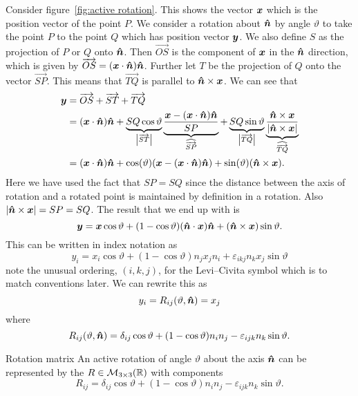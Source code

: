 \documentclass[a4paper]{article}
\newcommand{\nxmMatrices}[3]{\mathcal{M}_{{#1}\times{#2}}({#3})}
\begin{document}
    Consider figure~\ref{fig:active rotation}.
    This shows the vector \(\bm{x}\) which is the position vector of the point \(P\).
    We consider a rotation about \(\bm{\hat{n}}\) by angle \(\vartheta\) to take the point \(P\) to the point \(Q\) which has position vector \(\bm{y}\).
    We also define \(S\) as the projection of \(P\) or \(Q\) onto \(\bm{\hat{n}}\).
    Then \(\overrightarrow{OS}\) is the component of \(\bm{x}\) in the \(\bm{\hat{n}}\) direction, which is given by \(\overrightarrow{OS} = (\bm{x}\cdot\bm{\hat{n}})\bm{\hat{n}}\).
    Further let \(T\) be the projection of \(Q\) onto the vector \(\overrightarrow{SP}\).
    This means that \(\overrightarrow{TQ}\) is parallel to \(\bm{\hat{n}}\times\bm{x}\).
    We can see that
    \begin{align*}
        \bm{y} &= \overrightarrow{OS} + \overrightarrow{ST} + \overrightarrow{TQ}\\
        &= (\bm{x}\cdot\bm{\hat{n}})\bm{\hat{n}} + \underbrace{SQ\cos\vartheta}_{\abs{\overrightarrow{ST}}} \underbrace{\frac{\bm{x} - (\bm{x}\cdot\bm{\hat{n}})\bm{\hat{n}}}{SP}}_{\widehat{\overrightarrow{SP}}} + \underbrace{SQ\sin\vartheta}_{\abs{\overrightarrow{TQ}}} \underbrace{\frac{\bm{\hat{n}}\times\bm{x}}{\abs{\bm{\hat{n}}\times\bm{x}}}}_{\widehat{\overrightarrow{TQ}}}\\
        &= (\bm{x}\cdot\bm{\hat{n}})\bm{\hat{n}} + \cos(\vartheta)(\bm{x} - (\bm{x}\cdot\bm{\hat{n}})\bm{\hat{n}}) + \sin(\vartheta) (\bm{\hat{n}}\times\bm{x}).
    \end{align*}
    Here we have used the fact that \(SP = SQ\) since the distance between the axis of rotation and a rotated point is maintained by definition in a rotation.
    Also \(\abs{\bm{\hat{n}}\times\bm{x}} = SP = SQ\).
    The result that we end up with is
    \[\bm{y} = \bm{x} \cos\vartheta + (1 - \cos\vartheta) (\bm{\hat{n}}\cdot\bm{x})\bm{\hat{n}} + (\bm{\hat{n}}\times\bm{x})\sin\vartheta.\]
    This can be written in index notation as
    \[y_i = x_i\cos\vartheta + (1 - \cos\vartheta) n_jx_jn_i + \varepsilon_{ikj}n_kx_j\sin\vartheta\]
    note the unusual ordering, \((i, k, j)\), for the Levi--Civita symbol which is to match conventions later.
    We can rewrite this as
    \[y_i = R_{ij}(\vartheta, \bm{\hat{n}}) = x_j\]
    where 
    \[R_{ij}(\vartheta, \bm{\hat{n}}) = \delta_{ij} \cos\vartheta + (1 - \cos\vartheta)n_in_j - \varepsilon_{ijk}n_k\sin\vartheta.\]
    \begin{definition}{Rotation matrix}{}
        An active rotation of angle \(\vartheta\) about the axis \(\bm{\hat{n}}\) can be represented by the  \(R\in\nxmMatrices{3}{3}{\reals}\) with components
        \[R_{ij} = \delta_{ij} \cos\vartheta + (1 - \cos\vartheta)n_in_j - \varepsilon_{ijk}n_k\sin\vartheta.\]
    \end{definition}
\end{document}

